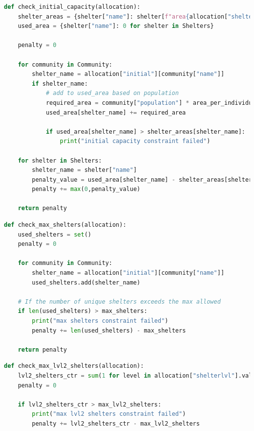 \begin{appendices}
\begin{centerappendixtitle}
\pagebreak
\begin{lstlisting}[language=Python,caption={Capacity Constraint}, label={capCode}]
def check_initial_capacity(allocation):
    shelter_areas = {shelter["name"]: shelter[f"area{allocation["shelterlvl"][shelter['name']]}"] for shelter in Shelters}
    used_area = {shelter["name"]: 0 for shelter in Shelters}

    penalty = 0

    for community in Community:
        shelter_name = allocation["initial"][community["name"]]
        if shelter_name:
            # add to used_area based on population
            required_area = community["population"] * area_per_individual
            used_area[shelter_name] += required_area

            if used_area[shelter_name] > shelter_areas[shelter_name]:
                print("initial capacity constraint failed")

    for shelter in Shelters:
        shelter_name = shelter["name"]
        penalty_value = used_area[shelter_name] - shelter_areas[shelter_name]
        penalty += max(0,penalty_value)

    return penalty
\end{lstlisting}

\begin{lstlisting}[language=Python,caption={Maximum Shelter Constraint}, label={maxshelCode}]
def check_max_shelters(allocation):
    used_shelters = set() 
    penalty = 0

    for community in Community:
        shelter_name = allocation["initial"][community["name"]]
        used_shelters.add(shelter_name)  

    # If the number of unique shelters exceeds the max allowed
    if len(used_shelters) > max_shelters:
        print("max shelters constraint failed")
        penalty += len(used_shelters) - max_shelters
            
    return penalty
\end{lstlisting}

\pagebreak
\begin{lstlisting}[language=Python,caption={Maximum Level 2 Shelter Constraint}, label={maxl2shelCode}]
def check_max_lvl2_shelters(allocation):
    lvl2_shelters_ctr = sum(1 for level in allocation["shelterlvl"].values() if level == 2)
    penalty = 0

    if lvl2_shelters_ctr > max_lvl2_shelters:
        print("max lvl2 shelters constraint failed")
        penalty += lvl2_shelters_ctr - max_lvl2_shelters 


\end{lstlisting}
\end{centerappendixtitle}
\end{appendices}
